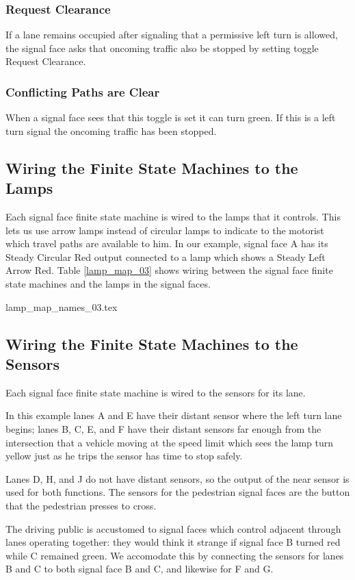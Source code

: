 \documentclass[letterpaper,twoside]{article}
\begin{document}
\subsubsection{Request Clearance}
If a lane remains occupied after signaling that a permissive left
turn is allowed, the signal face asks that oncoming traffic also
be stopped by setting toggle Request Clearance.

\subsubsection{Conflicting Paths are Clear}
When a signal face sees that this toggle is set it can turn green.
If this is a left turn signal the oncoming traffic has been stopped.

\subsection{Wiring the Finite State Machines to the Lamps}

Each signal face finite state machine is wired to the lamps that
it controls.  This lets us use arrow lamps instead of circular lamps
to indicate to the motorist which travel paths are available to him.
In our example, signal face A has its Steady Circular Red output
connected to a lamp which shows a Steady Left Arrow Red.
Table \ref{lamp_map_03} shows wiring between the signal face finite state
machines and the lamps in the signal faces.

 {lamp_map_names_03.tex}

\subsection{Wiring the Finite State Machines to the Sensors}

Each signal face finite state machine is wired to the sensors
for its lane.

In this example lanes A and E have their distant sensor where
the left turn lane begins; lanes B, C, E, and F have their
distant sensors far enough from the intersection that a vehicle
moving at the speed limit which sees the lamp turn yellow
just as he trips the sensor has time to stop safely.

Lanes D, H, and J do not have distant sensors, so the output
of the near sensor is used for both functions.  The sensors
for the pedestrian signal faces are the button that the pedestrian presses
to cross.

The driving public is accustomed to signal faces which control
adjacent through lanes operating together: they would think it strange
if signal face B turned red while C remained green.  We accomodate this
by connecting the sensors for lanes B and C to both signal face B
and C, and likewise for F and G.
\end{document}
